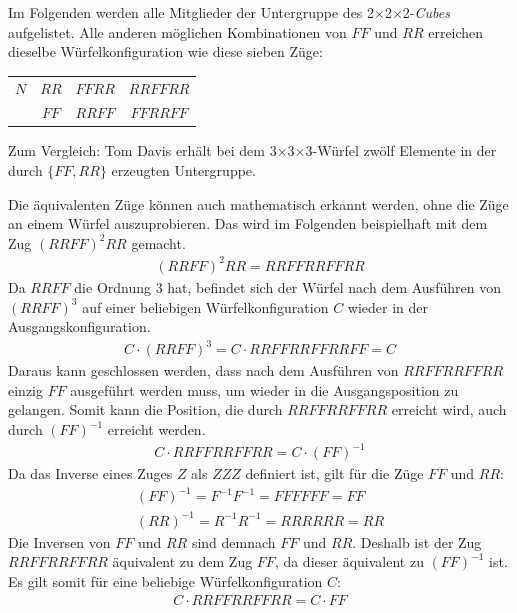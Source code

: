 \documentclass[12pt,a4paper, usenames, dvipsnames]{article}
\theoremstyle{mystyle}
\theoremstyle{definition}
\newcommand{\Ttwo}{2$\times$2$\times$2-}
\newcommand{\Tthree}{3$\times$3$\times$3-}
\begin{document}
Im Folgenden werden alle Mitglieder der Untergruppe des \Ttwo \textit{Cubes} aufgelistet. Alle anderen möglichen Kombinationen von $FF$ und $RR$ erreichen dieselbe Würfelkonfiguration wie diese sieben Züge:
\begin{center}
\centering
\begin{tabular}{c c c c}
$N$ & $RR$ & $FFRR$ &  $RRFFRR$ \\
& $FF$ & $RRFF$ & $FFRRFF$   \\
\end{tabular}
\end{center}
Zum Vergleich: Tom Davis erhält bei dem  \Tthree Würfel zwölf Elemente in der durch $\{ FF, RR \}$ erzeugten Untergruppe.

Die äquivalenten Züge können auch mathematisch erkannt werden, ohne die Züge an einem Würfel auszuprobieren.
Das wird im Folgenden beispielhaft mit dem Zug $(RRFF)^2 RR$ gemacht.
\begin{align*}
(RRFF)^2 RR = RRFFRRFFRR
\end{align*}
Da $RRFF$ die Ordnung 3 hat, befindet sich der Würfel nach dem Ausführen von $(RRFF)^3$ auf einer beliebigen Würfelkonfiguration $C$ wieder in der Ausgangskonfiguration.
\begin{align*}
C \cdot (RRFF)^3 = C \cdot RRFFRRFFRRFF = C
\end{align*}
Daraus kann geschlossen werden, dass nach dem Ausführen von $RRFFRRFFRR$ einzig $FF$ ausgeführt werden muss, um wieder in die Ausgangsposition zu gelangen. Somit kann die Position, die durch $RRFFRRFFRR$ erreicht wird, auch durch $(FF)^{-1}$ erreicht werden.
\begin{align*}
C \cdot RRFFRRFFRR = C \cdot (FF)^{-1}
\end{align*}
Da das Inverse eines Zuges $Z$ als $ZZZ$ definiert ist, gilt für die Züge $FF$ und $RR$:
\begin{align*}
(FF)^{-1} = F^{-1}F^{-1} = FFFFFF = FF \\
(RR)^{-1} = R^{-1}R^{-1} = RRRRRR = RR
\end{align*}
Die Inversen von $FF$ und $RR$ sind demnach $FF$ und $RR$. Deshalb ist der Zug $RRFFRRFFRR$ äquivalent zu dem Zug $FF$, da dieser äquivalent zu $(FF)^{-1}$ ist. Es gilt somit für eine beliebige Würfelkonfiguration $C$:
\begin{align*}
C \cdot RRFFRRFFRR = C \cdot FF
\end{align*}
\end{document}
